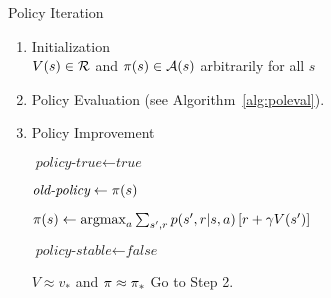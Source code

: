 
\begin{algorithm}
\caption{Policy Iteration}
\label{alg:politer}

\begin{enumerate}[topsep=0pt]

	\item Initialization \\
		$V(s) \in \mathcal{R}$
		and
		$\pi(s) \in \mathcal{A}(s)$ arbitrarily for all $s$

	\item Policy Evaluation (see Algorithm~\ref{alg:poleval}).


	\item Policy Improvement
		\begin{algorithmic}[0]
			\State $\textit{policy-true} \gets \textit{true}$


				\State $\textit{old-policy} \gets \pi(s)$

				\State $\pi(s) \gets
					\operatorname*{argmax}_{a} \sum_{s',r} {
						p(s',r|s,a)\left[r+\gamma V(s')\right]
						}$

					\State $\textit{policy-stable} \gets \textit{false}$
				\EndIf

			\EndFor

				\State \Return $V \approx v_*$
					and $\pi \approx \pi_*$
			\Else
				\State Go to Step 2.
			\EndIf
		\end{algorithmic}

\end{enumerate}

\end{algorithm}
